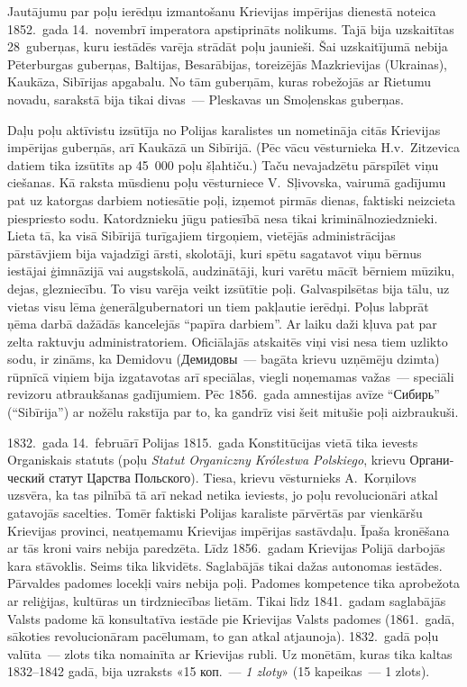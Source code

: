 \documentclass[twoside,a5paper,12pt,fleqn,openany]{extbook}
\newcommand{\pltxti}[1]{\textit{\textpolish{#1}}}
\newcommand{\rutxti}[1]{\textrussian{#1}}
\begin{document}
Jautājumu par poļu ierēdņu izmantošanu Krievijas impērijas dienestā noteica 1852.~gada 14.~novembrī imperatora apstiprināts nolikums. Tajā bija uzskaitītas 28~guberņas, kuru iestādēs varēja strādāt poļu jaunieši. Šai uzskaitījumā nebija Pēterburgas guberņas, Baltijas, Besarābijas, toreizējās Mazkrievijas (Ukrainas), Kaukāza, Sibīrijas apgabalu. No tām guberņām, kuras robežojās ar Rietumu novadu, sarakstā bija tikai divas~--- Pleskavas un Smoļenskas guberņas.

Daļu poļu aktīvistu izsūtīja no Polijas karalistes un nometināja citās Krievijas impērijas guberņās, arī Kaukāzā un Sibīrijā. (Pēc vācu vēsturnieka H.v.~Zitzevica datiem tika izsūtīts ap 45~000 poļu šļahtiču.) Taču nevajadzētu pārspīlēt viņu ciešanas. Kā raksta mūsdienu poļu vēsturniece V.~Sļivovska, vairumā gadījumu pat uz katorgas darbiem notiesātie poļi, izņemot pirmās dienas, faktiski neizcieta piespriesto sodu. Katordznieku jūgu patiesībā nesa tikai kriminālnoziedznieki. Lieta tā, ka visā Sibīrijā turīgajiem tirgoņiem, vietējās administrācijas pārstāvjiem bija vajadzīgi ārsti, skolotāji, kuri spētu sagatavot viņu bērnus iestājai ģimnāzijā vai augstskolā, audzinātāji, kuri varētu mācīt bērniem mūziku, dejas, glezniecību. To visu varēja veikt izsūtītie poļi. Galvaspilsētas bija tālu, uz vietas visu lēma ģenerālgubernatori un tiem pakļautie ierēdņi. Poļus labprāt ņēma darbā dažādās kancelejās ``papīra darbiem''. Ar laiku daži kļuva pat par zelta raktuvju administratoriem. Oficiālajās atskaitēs viņi visi nesa tiem uzlikto sodu, ir zināms, ka Demidovu (\rutxti{Демидовы}~--- bagāta krievu uzņēmēju dzimta) rūpnīcā viņiem bija izgatavotas arī speciālas, viegli noņemamas važas~--- speciāli revizoru atbraukšanas gadījumiem. Pēc 1856.~gada amnestijas avīze ``\rutxti{Сибирь}'' (``Sibīrija'') ar nožēlu rakstīja par to, ka gandrīz visi šeit mitušie poļi aizbraukuši.

1832.~gada 14.~februārī Polijas 1815.~gada Konstitūcijas vietā tika ievests Organiskais statuts (poļu \pltxti{Statut Organiczny Królestwa Polskiego}, krievu \rutxti{Органический статут Царства Польского}). Tiesa, krievu vēsturnieks A.~Korņilovs uzsvēra, ka tas pilnībā tā arī nekad netika ieviests, jo poļu revolucionāri atkal gatavojās sacelties. Tomēr faktiski Polijas karaliste pārvērtās par vienkāršu Krievijas provinci, neatņemamu Krievijas impērijas sastāvdaļu. Īpaša kronēšana ar tās kroni vairs nebija paredzēta. Līdz 1856.~gadam Krievijas Polijā darbojās kara stāvoklis. Seims tika likvidēts. Saglabājās tikai dažas autonomas iestādes. Pārvaldes padomes locekļi vairs nebija poļi. Padomes kompetence tika aprobežota ar reliģijas, kultūras un tirdzniecības lietām. Tikai līdz 1841.~gadam saglabājās Valsts padome kā konsultatīva iestāde pie Krievijas Valsts padomes (1861.~gadā, sākoties revolucionāram pacēlumam, to gan atkal atjaunoja). 1832.~gadā poļu valūta~--- zlots tika nomainīta ar Krievijas rubli. Uz monētām, kuras tika kaltas 1832--1842 gadā, bija uzraksts «\rutxti{15 коп.}~--- \pltxti{1 zloty}» (15 kapeikas~--- 1 zlots).
\end{document}
